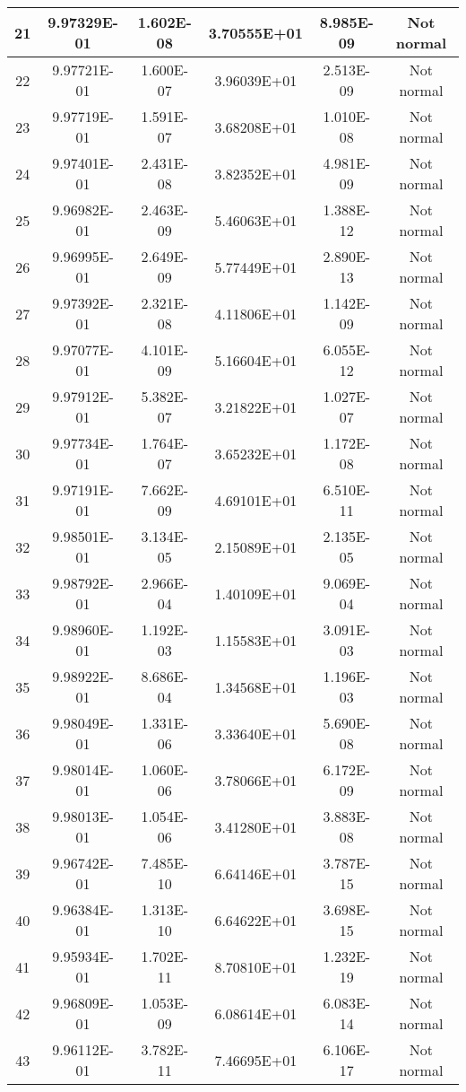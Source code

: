 \begin{table}[h]
\begin{tabular}{|c|c|c|c|c|c|}
		21 & 9.97329E-01 & 1.602E-08 & 3.70555E+01 & 8.985E-09 & Not normal\\\hline
		22 & 9.97721E-01 & 1.600E-07 & 3.96039E+01 & 2.513E-09 & Not normal\\\hline
		23 & 9.97719E-01 & 1.591E-07 & 3.68208E+01 & 1.010E-08 & Not normal\\\hline
		24 & 9.97401E-01 & 2.431E-08 & 3.82352E+01 & 4.981E-09 & Not normal\\\hline
		25 & 9.96982E-01 & 2.463E-09 & 5.46063E+01 & 1.388E-12 & Not normal\\\hline
		26 & 9.96995E-01 & 2.649E-09 & 5.77449E+01 & 2.890E-13 & Not normal\\\hline
		27 & 9.97392E-01 & 2.321E-08 & 4.11806E+01 & 1.142E-09 & Not normal\\\hline
		28 & 9.97077E-01 & 4.101E-09 & 5.16604E+01 & 6.055E-12 & Not normal\\\hline
		29 & 9.97912E-01 & 5.382E-07 & 3.21822E+01 & 1.027E-07 & Not normal\\\hline
		30 & 9.97734E-01 & 1.764E-07 & 3.65232E+01 & 1.172E-08 & Not normal\\\hline
		31 & 9.97191E-01 & 7.662E-09 & 4.69101E+01 & 6.510E-11 & Not normal\\\hline
		32 & 9.98501E-01 & 3.134E-05 & 2.15089E+01 & 2.135E-05 & Not normal\\\hline
		33 & 9.98792E-01 & 2.966E-04 & 1.40109E+01 & 9.069E-04 & Not normal\\\hline
		34 & 9.98960E-01 & 1.192E-03 & 1.15583E+01 & 3.091E-03 & Not normal\\\hline
		35 & 9.98922E-01 & 8.686E-04 & 1.34568E+01 & 1.196E-03 & Not normal\\\hline
		36 & 9.98049E-01 & 1.331E-06 & 3.33640E+01 & 5.690E-08 & Not normal\\\hline
		37 & 9.98014E-01 & 1.060E-06 & 3.78066E+01 & 6.172E-09 & Not normal\\\hline
		38 & 9.98013E-01 & 1.054E-06 & 3.41280E+01 & 3.883E-08 & Not normal\\\hline
		39 & 9.96742E-01 & 7.485E-10 & 6.64146E+01 & 3.787E-15 & Not normal\\\hline
		40 & 9.96384E-01 & 1.313E-10 & 6.64622E+01 & 3.698E-15 & Not normal\\\hline
		41 & 9.95934E-01 & 1.702E-11 & 8.70810E+01 & 1.232E-19 & Not normal\\\hline
		42 & 9.96809E-01 & 1.053E-09 & 6.08614E+01 & 6.083E-14 & Not normal\\\hline
		43 & 9.96112E-01 & 3.782E-11 & 7.46695E+01 & 6.106E-17 & Not normal\\\hline

\end{tabular}
\end{table}
